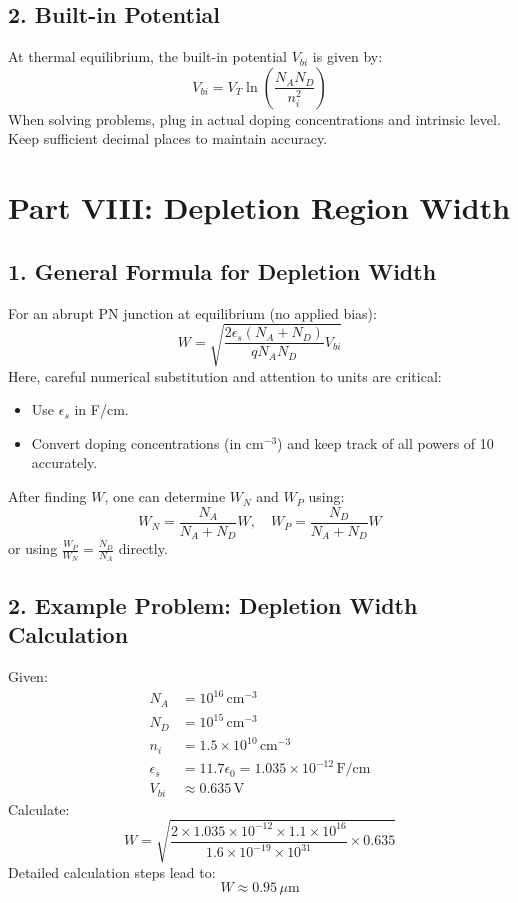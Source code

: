 \documentclass[12pt]{article}
\begin{document}
\subsection{2. Built-in Potential}
At thermal equilibrium, the built-in potential \( V_{bi} \) is given by:
\[
V_{bi} = V_T \ln\left(\frac{N_A N_D}{n_i^2}\right)
\]
When solving problems, plug in actual doping concentrations and intrinsic level. Keep sufficient decimal places to maintain accuracy.

\section{Part VIII: Depletion Region Width}

\subsection{1. General Formula for Depletion Width}
For an abrupt PN junction at equilibrium (no applied bias):
\[
W = \sqrt{\frac{2\epsilon_s (N_A + N_D)}{q N_A N_D} V_{bi}}
\]
Here, careful numerical substitution and attention to units are critical:
\begin{itemize}
    \item Use \( \epsilon_s \) in F/cm.
    \item Convert doping concentrations (in \( \text{cm}^{-3} \)) and keep track of all powers of 10 accurately.
\end{itemize}
After finding \( W \), one can determine \( W_N \) and \( W_P \) using:
\[
W_N = \frac{N_A}{N_A + N_D}W, \quad W_P = \frac{N_D}{N_A + N_D}W
\]
or using \( \frac{W_P}{W_N} = \frac{N_D}{N_A} \) directly.

\subsection{2. Example Problem: Depletion Width Calculation}
Given:
\begin{align*}
N_A &= 10^{16}\, \text{cm}^{-3} \\
N_D &= 10^{15}\, \text{cm}^{-3} \\
n_i &= 1.5 \times 10^{10}\, \text{cm}^{-3} \\
\epsilon_s &= 11.7 \epsilon_0 = 1.035 \times 10^{-12}\, \text{F/cm} \\
V_{bi} &\approx 0.635\, \text{V}
\end{align*}
Calculate:
\[
W = \sqrt{\frac{2 \times 1.035 \times 10^{-12} \times 1.1 \times 10^{16}}{1.6 \times 10^{-19} \times 10^{31}} \times 0.635}
\]
Detailed calculation steps lead to:
\[
W \approx 0.95\, \mu\text{m}
\]
\end{document}

